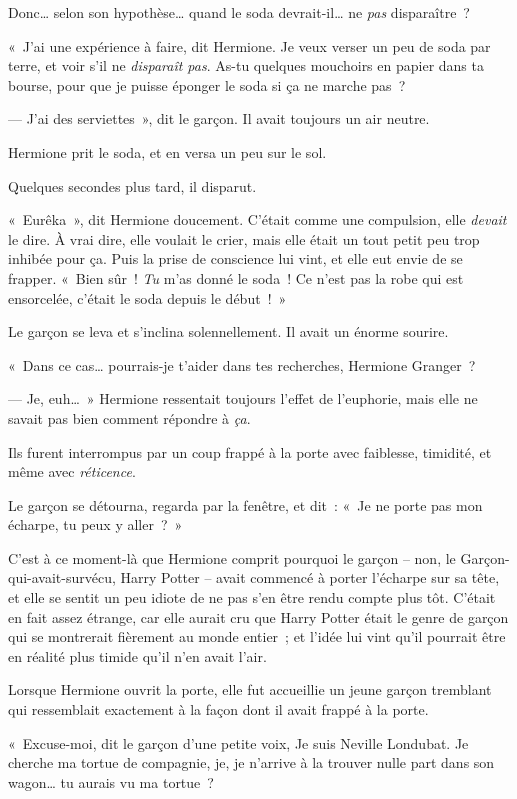 Donc… selon son hypothèse… quand le soda devrait-il… ne \emph{pas} disparaître~?

«~J'ai une expérience à faire, dit Hermione. Je veux verser un peu de soda par terre, et voir s'il ne \emph{disparaît pas}. As-tu quelques mouchoirs en papier dans ta bourse, pour que je puisse éponger le soda si ça ne marche pas~?

--- J'ai des serviettes~», dit le garçon. Il avait toujours un air neutre.

Hermione prit le soda, et en versa un peu sur le sol.

Quelques secondes plus tard, il disparut.

«~Eurêka~», dit Hermione doucement. C'était comme une compulsion, elle \emph{devait} le dire. À vrai dire, elle voulait le crier, mais elle était un tout petit peu trop inhibée pour ça. Puis la prise de conscience lui vint, et elle eut envie de se frapper. «~Bien sûr~! \emph{Tu} m'as donné le soda~! Ce n'est pas la robe qui est ensorcelée, c'était le soda depuis le début~!~»

Le garçon se leva et s'inclina solennellement. Il avait un énorme sourire.

«~Dans ce cas… pourrais-je t'aider dans tes recherches, Hermione Granger~?

--- Je, euh…~» Hermione ressentait toujours l'effet de l'euphorie, mais elle ne savait pas bien comment répondre à \emph{ça}.

Ils furent interrompus par un coup frappé à la porte avec faiblesse, timidité, et même avec \emph{réticence}.

Le garçon se détourna, regarda par la fenêtre, et dit~: «~Je ne porte pas mon écharpe, tu peux y aller~?~»

C'est à ce moment-là que Hermione comprit pourquoi le garçon -- non, le Garçon-qui-avait-survécu, Harry Potter -- avait commencé à porter l'écharpe sur sa tête, et elle se sentit un peu idiote de ne pas s'en être rendu compte plus tôt. C'était en fait assez étrange, car elle aurait cru que Harry Potter était le genre de garçon qui se montrerait fièrement au monde entier~; et l'idée lui vint qu'il pourrait être en réalité plus timide qu'il n'en avait l'air.

Lorsque Hermione ouvrit la porte, elle fut accueillie un jeune garçon tremblant qui ressemblait exactement à la façon dont il avait frappé à la porte.

«~Excuse-moi, dit le garçon d'une petite voix, Je suis Neville Londubat. Je cherche ma tortue de compagnie, je, je n'arrive à la trouver nulle part dans son wagon… tu aurais vu ma tortue~?

